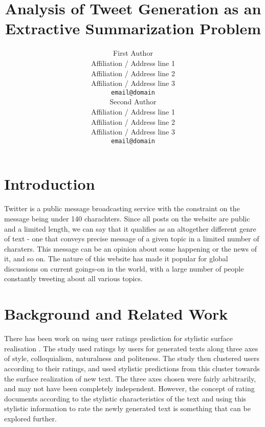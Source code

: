 \documentclass[11pt]{article}
\title{Analysis of Tweet Generation as an Extractive Summarization Problem}
\author{First Author \\
  Affiliation / Address line 1 \\
  Affiliation / Address line 2 \\
  Affiliation / Address line 3 \\
  {\tt email@domain} \\\And
  Second Author \\
  Affiliation / Address line 1 \\
  Affiliation / Address line 2 \\
  Affiliation / Address line 3 \\
  {\tt email@domain} \\}
\date{}
\begin{document}
\maketitle
\begin{abstract}
\end{abstract}


\section{Introduction}

Twitter is a public message broadcasting service with the constraint on the message being under 140 charachters. Since all posts on the website are public and a limited length, we can say that it qualifies as an altogether different genre of text - one that conveys precise message of a given topic in a limited number of charaters. This message can be an opinion about some happening or the news of it, and so on. The nature of this website has made it popular for global discussions on current goings-on in the world, with a large number of people constantly tweeting about all various topics.




\section{Background and Related Work}

There has been work on using user ratings prediction for stylistic surface realisation . The study used ratings by users for generated texts along three axes of style, colloquialism, naturalness and politeness. The study then clustered users according to their ratings, and used stylistic predictions from this cluster towards the surface realization of new text. The three axes chosen were fairly arbitrarily, and may not have been completely independent. However, the concept of rating documents according to the stylistic characteristics of the text and using this stylistic information to rate the newly generated text is something that can be explored further. 
\end{document}

